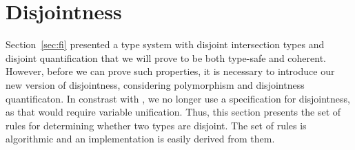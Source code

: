 \section{Disjointness} \label{sec:alg-dis}

Section~\ref{sec:fi} presented a type system with disjoint
intersection types and disjoint quantification that we will prove to be
both type-safe and coherent. 
However, before we can prove such properties, it is necessary to introduce our
new version of disjointness, considering polymorphism and disjointness quantificaton.
In constrast with \oldname, we no longer use a specification for disjointness, as
that would require variable unification.
Thus, this section presents the set of rules for determining whether two types are disjoint. 
The set of rules is algorithmic and an implementation is easily derived from them. 

